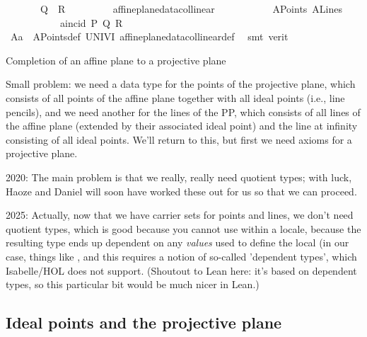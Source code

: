 \begin{isabellebody}
\ \ \ \ \ \ \ Q\ {\isasymnoteq}\ R\ {\isasymand}\isanewline
\ \ \ \ \ \ \ {\isasymnot}\ affine{\isacharunderscore}{\kern0pt}plane{\isacharunderscore}{\kern0pt}data{\isachardot}{\kern0pt}collinear\isanewline
\ \ \ \ \ \ \ \ \ \ \ A{}Points\ A{}Lines\isanewline
\ \ \ \ \ \ \ \ \ \ \ a{}incid\ P\ Q\ R{\isachardoublequoteclose}\ \isamarkupfalse%
\ A{}{\isacharunderscore}{\kern0pt}a{}\ \ A{}Points{\isacharunderscore}{\kern0pt}def\ UNIV{\isacharunderscore}{\kern0pt}I\ affine{\isacharunderscore}{\kern0pt}plane{\isacharunderscore}{\kern0pt}data{\isachardot}{\kern0pt}collinear{\isacharunderscore}{\kern0pt}def\ \isamarkupfalse%
\ {\isacharparenleft}{\kern0pt}smt\ {\isacharparenleft}{\kern0pt}verit{\isacharparenright}{\kern0pt}{\isacharparenright}{\kern0pt}\isanewline
\isanewline
{}\isamarkupfalse%
%
\endisatagproof
{\isafoldproof}%
%
\isadelimproof
%
\endisadelimproof
%
\begin{isamarkuptext}%
\spike
Completion of an affine plane to a projective plane 

Small problem: we need a data type for the points of the projective plane, which consists of
     all points of the affine plane together with all ideal points (i.e., line pencils), and we 
     need another for the lines of the PP, which consists of all lines of the affine plane (extended 
     by their associated ideal point) and the line at infinity consisting of all ideal points. We'll
     return to this, but first we need axioms for a projective plane.

2020: The main problem is that we really, really need quotient types; with luck, Haoze and Daniel will 
soon have worked these out for us so that we can proceed. 

2025: Actually, now that we have carrier sets for points and lines, we don't need quotient types,
which is good because you cannot use  within a locale, because the resulting type
ends up dependent on any \emph{values} used to define the local (in our case, things like , 
and this requires a notion of so-called 'dependent types', which Isabelle/HOL does not support. (Shoutout
to Lean here: it's based on dependent types, so this particular bit would be much nicer in Lean.)
\done%
\end{isamarkuptext}\isamarkuptrue%
%
\begin{isamarkuptext}%
\begin{hartshorne}
\section*{Ideal points and the projective plane}


\end{hartshorne}
\end{isamarkuptext}
\end{isabellebody}
